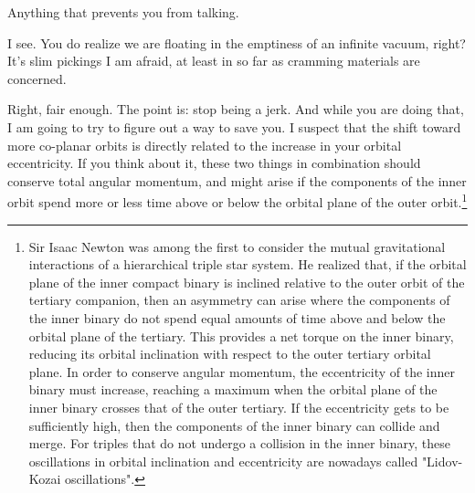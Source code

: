 \documentclass[main.tex]{subfiles}
\begin{document}
\par \Celaeno Anything that prevents you from talking.  

\par \Alcyone I see.  You do realize we are floating in the emptiness of an infinite vacuum, right?  It's slim pickings I am afraid, at least in so far as cramming materials are concerned.

\par \Celaeno Right, fair enough.  The point is:  stop being a jerk.  And while you are doing that, I am going to try to figure out a way to save you.  I suspect that the shift toward more co-planar orbits is directly related to the increase in your orbital eccentricity.  If you think about it, these two things in combination should conserve total angular momentum, and might arise if the components of the inner orbit spend more or less time above or below the orbital plane of the outer orbit.\footnote{Sir Isaac Newton was among the first to consider the mutual gravitational interactions of a hierarchical triple star system.  He realized that, if the orbital plane of the inner compact binary is inclined relative to the outer orbit of the tertiary companion, then an asymmetry can arise where the components of the inner binary do not spend equal amounts of time above and below the orbital plane of the tertiary.  This provides a net torque on the inner binary, reducing its orbital inclination with respect to the outer tertiary orbital plane.  In order to conserve angular momentum, the eccentricity of the inner binary must increase, reaching a maximum when the orbital plane of the inner binary crosses that of the outer tertiary.  If the eccentricity gets to be sufficiently high, then the components of the inner binary can collide and merge.  For triples that do not undergo a collision in the inner binary, these oscillations in orbital inclination and eccentricity are nowadays called "Lidov-Kozai oscillations".} 

\end{document}
